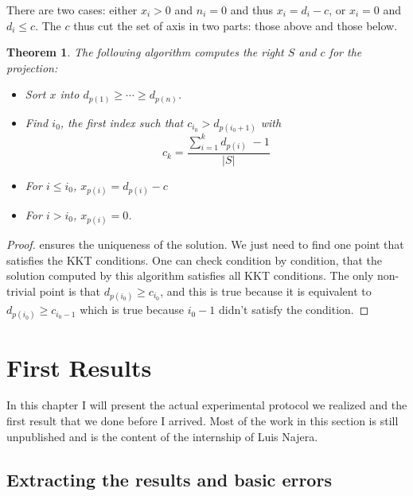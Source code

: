 \documentclass[10pt,a4paper]{report}
\theoremstyle{plain}
\newtheorem{thm}{Theorem}[chapter]
\theoremstyle{definition}
\theoremstyle{remark}
\renewcommand{\geq}{\geqslant}
\renewcommand{\leq}{\leqslant}
\begin{document}
There are two cases: either $x_i > 0$ and $n_i = 0$ and thus $x_i = d_i - c$, or
$x_i = 0$ and $d_i \leq c$. The $c$ thus cut the set of axis in two parts: those above
and those below.

\begin{thm}
  The following algorithm computes the right $S$ and $c$ for the projection:
\begin{itemize}
\item Sort $x$ into $d_{p(1)} \geq \cdots \geq d_{p(n)}$.
\item Find $i_0$, the first index such that $c_{i_0} > d_{p(i_0+1)}$ with
  \[c_k = \frac{\sum\limits_{i = 1}^{k}\! d_{p(i)}\; -1}{|S|}\]
\item For $i \leq i_0$, $x_{p(i)} = d_{p(i)} - c$
\item For $i > i_0$, $x_{p(i)} = 0$.
\end{itemize}
\end{thm}

\begin{proof}
   ensures the uniqueness of the solution. We just need to
  find one point that satisfies the KKT conditions. One can check condition by
  condition, that the solution computed by this algorithm satisfies all KKT
  conditions. The only non-trivial point is that $d_{p(i_0)} \geq c_{i_0}$, and
  this is true because it is equivalent to $d_{p(i_0)} \geq c_{i_0 -1}$ which is
  true because $i_0 -1$ didn't satisfy the condition.
\end{proof}







\chapter{First Results}

In this chapter I will present the actual experimental protocol we realized and the
first result that we done before I arrived.
Most of the work in this section is still unpublished and is the
content of the internship of Luis Najera.

\section{Extracting the results and basic errors}\label{sec:basicerr}
\end{document}
